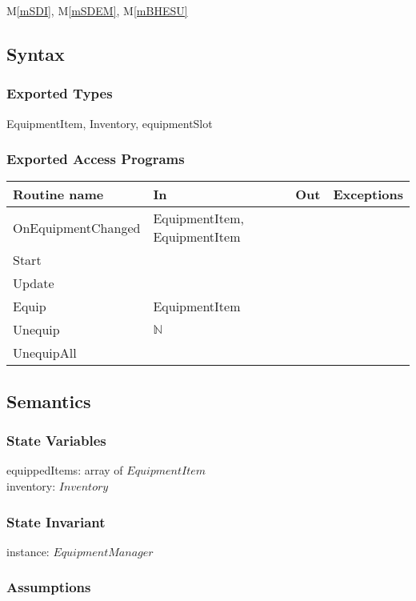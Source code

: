 \documentclass[12pt]{article}
\newcommand{\mref}[1]{M\ref{#1}}
\begin{document}
\mref{mSDI}, \mref{mSDEM}, \mref{mBHESU}

\subsection* {Syntax}

\subsubsection* {Exported Types}

EquipmentItem, Inventory, equipmentSlot

\subsubsection* {Exported Access Programs}

\begin{tabular}{| l | l | l | l |}
\hline
\textbf{Routine name} & \textbf{In} & \textbf{Out} & \textbf{Exceptions}\\
\hline
OnEquipmentChanged & EquipmentItem, EquipmentItem & ~  & ~\\
Start &~ & ~  & ~\\
Update &~ & ~  & ~\\
Equip & EquipmentItem & ~  & ~\\
Unequip & $\mathbb{N}$ & ~  & ~\\
UnequipAll &~ & ~  & ~ \\
\hline
\end{tabular}

\subsection* {Semantics}

\subsubsection* {State Variables}

equippedItems: array of $EquipmentItem$\\
inventory: $Inventory$

\subsubsection* {State Invariant}

instance: $EquipmentManager$

\subsubsection* {Assumptions}
\end{document}

